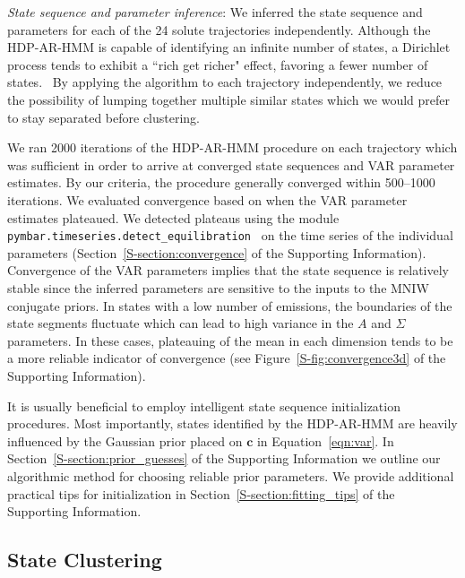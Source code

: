 \documentclass[journal=jpcbfk,manuscript=article]{achemso}
\begin{document}
  
  \textit{State sequence and parameter inference}: We inferred the 
  state sequence and parameters for each of the 24 solute trajectories independently.
  Although the HDP-AR-HMM is capable of identifying an infinite number of states, 
  a Dirichlet process tends to exhibit a ``rich get richer" effect, favoring
  a fewer number of states.~\cite{dreyer_discovering_2011} By applying the algorithm to each trajectory 
  independently, we reduce the possibility of lumping together multiple 
  similar states which we would prefer to stay separated before clustering.
  
  We ran 2000 iterations of the HDP-AR-HMM procedure on each trajectory which
  was sufficient in order to arrive at converged state sequences and VAR parameter
  estimates. By our criteria, the procedure generally converged within 500--1000 iterations. We 
  evaluated convergence based on when the VAR parameter estimates plateaued. 
  We detected plateaus using the module \texttt{pymbar.timeseries.detect\_equilibration}~\cite{chodera_simple_2016} 
  on the time series of the individual parameters (Section~\ref{S-section:convergence}
  of the Supporting Information). Convergence of the VAR parameters implies that
  the state sequence is relatively stable since the inferred parameters are 
  sensitive to the inputs to the MNIW conjugate priors. In states with a low number
  of emissions, the boundaries of the state segments fluctuate which can lead to high
  variance in the $A$ and $\Sigma$ parameters. In these cases, plateauing of the mean in each dimension 
  tends to be a more reliable indicator of convergence (see 
  Figure~\ref{S-fig:convergence3d} of the Supporting Information).
  
  It is usually beneficial to employ intelligent state sequence initialization procedures. 
  Most importantly, states identified by the HDP-AR-HMM are heavily influenced by the 
  Gaussian prior placed on $\mathbf{c}$ in Equation~\ref{eqn:var}. In 
  Section~\ref{S-section:prior_guesses} of the Supporting Information we outline our 
  algorithmic method for choosing reliable prior parameters. We provide additional 
  practical tips for initialization in Section~\ref{S-section:fitting_tips}
  of the Supporting Information.
  
  \subsection{State Clustering}\label{method:clustering}  
\end{document}
